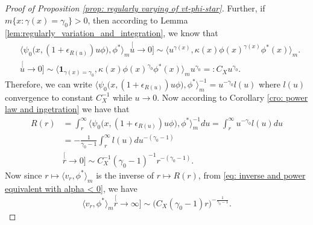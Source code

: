 \documentclass[12pt, a4paper]{amsart}
\theoremstyle{definition}
\numberwithin{equation}{section}
\begin{document}
\begin{proof}[Proof of Proposition \ref{prop: regularly varying of vt-phi-star}]
	Further, if $m\{x: \gamma(x) = \gamma_0\}> 0$, then according to Lemma \ref{lem:regularly_variation_and_integration}, we know that 
\[\begin{split}
	&\big\langle \psi_0 \big(x,( 1 + \epsilon_{R(u)} ) u \phi \big), \phi^* \big\rangle_m
	\stackrel[u\to 0]{}{\sim}  \langle u^{\gamma(x)} , \kappa (x)\phi(x)^{\gamma(x)} \phi^*(x) \rangle_m.
	\\ & \stackrel[u\to 0]{}{\sim}  \langle \mathbf 1_{\gamma(x)= \gamma_0}, \kappa (x)\phi(x)^{\gamma_0} \phi^*(x) \rangle_m u^{\gamma_0}
	=: C_X u^{\gamma_0}.
\end{split}\]
	Therefore, we can write $\big\langle \psi_0 \big(x,( 1 + \epsilon_{R(u)} ) u \phi \big), \phi^* \big\rangle_m^{-1} = u^{-\gamma_0} l(u)$ where $l(u)$ convergence to constant $C_X^{-1}$ while $u \to 0$.
	Now according to Corollary \ref{cro: power law and ingetration} we have that
\[\begin{split}
	R(r)
	&= \int_r^\infty \big\langle \psi_0 \big(x,( 1 + \epsilon_{R(u)} ) u \phi \big), \phi^* \big\rangle_m^{-1} du
	= \int_r^\infty u^{-\gamma_0} l(u) du 
	\\&= -\frac{1}{\gamma_0-1}\int_r^\infty l(u) du^{-(\gamma_0 - 1)} 
	\\&\stackrel[r\to 0]{}{\sim} C_X^{-1} (\gamma_0-1)^{-1} r^{-(\gamma_0 - 1)}.
\end{split}\]
	Now since $r\mapsto \langle v_r,\phi^*\rangle_m$ is the inverse of $r\mapsto R(r)$, from \eqref{eq: inverse and power equivalent with alpha < 0}, we have
\[
	\langle v_r,\phi^*\rangle_m
	\stackrel[r\to \infty]{}{\sim} \big(C_X (\gamma_0-1) r \big)^{-\frac{1}{\gamma_0 - 1}}.
\]
\end{proof}
\end{document}
